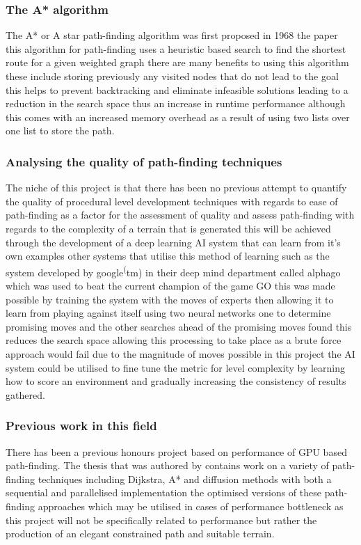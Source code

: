 \subsubsection{The A* algorithm}
The A* or A star path-finding algorithm was first proposed in 1968 the paper \cite{A*} this algorithm for path-finding uses a heuristic based search to find the shortest route for a given weighted graph there are many benefits to using this algorithm these include storing previously any visited nodes that do not lead to the goal this helps to prevent backtracking and eliminate infeasible solutions leading to a reduction in the search space thus an increase in runtime performance although this comes with an increased memory overhead as a result of using two lists over one list to store the path.   
\subsubsection{Analysing the quality of path-finding techniques}
\label{quality}
The niche of this project is that there has been no previous attempt to quantify the quality of procedural level development techniques with regards to ease of path-finding as a factor for the assessment of quality and assess path-finding with regards to the complexity of a terrain that is generated this will be achieved through the development of a deep learning AI system that can learn from it's own examples other systems that utilise this method of learning such as the system developed by google\textsuperscript(tm) in their deep mind department called alphago which was used to beat the current champion of the game GO\cite{AI-learning} this was made possible by training the system with the moves of experts then allowing it to learn from playing against itself using two neural networks one to determine promising moves and the other searches ahead of the promising moves found this reduces the search space allowing this processing to take place as a brute force approach would fail due to the magnitude of moves possible in this project the AI system could be utilised to fine tune the metric for level complexity by learning how to score an environment and gradually increasing the consistency of results gathered.

\subsubsection{Previous work in this field}
There has been a previous honours project based on performance of GPU based path-finding. The thesis that was authored by \cite{honours} contains work on a variety of path-finding techniques including Dijkstra, A* and diffusion methods with both a sequential and parallelised implementation the optimised versions of these path-finding approaches which may be utilised in cases of performance bottleneck as this project will not be specifically related to performance but rather the production of an elegant constrained path and suitable terrain.


